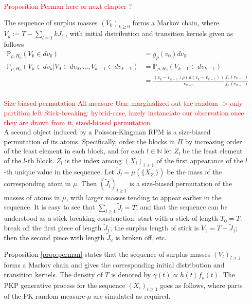 \textcolor{red}{Proposition Perman here or next chapter ?}
\begin{proposition} \label{prop:perman}
The sequence of surplus masses $\left(V_k \right)_{k \ge 0}$ forms a Markov chain, where $V_k := T - \sum_{l=1}k J_l$ , with initial distribution and transition kernels given as follows
\begin{equation*}
\begin{aligned}
\mathbb{P}_{\rho,H_0}(V_0 \in dv_0) &= g_\rho(v_0)dv_0 \\
\mathbb{P}_{\rho,H_0}(V_k \in dv_k|V_0 \in dv_0,\dots, V_{k-1} \in dv_{k-1}) &=  \mathbb{P}_{\rho,H_0}(V_{k-1} \in dv_{k-1})\\
&= \frac{(v_k-v_{k-1})\rho(d(v_k-v_{k-1}))}{v_{k-1}} \frac{f_\rho(v_{k-1})}{f_\rho(v_{k-1})} \\
\end{aligned}
\end{equation*}
\end{proposition}


\textcolor{red}{Size-biased permutation
All measure
Urn: marginalized out the random -> only partition left
Stick-breaking: hybrid-case, lazely instanciate our observation once they are drawn from it, sized-biased permutation }\\

A second object induced by a Poisson-Kingman \gls{RPM} is a size-biased permutation of its atoms. Specifically, order the blocks in $\Pi$ by increasing order of the least element in each block, and for each $l \in \mathbb{N}$ let $Z_l$ be the least element of the $l$-th block. $Z_l$ is the index among $(X_i)_{i \ge 1}$ of the first appearance of the $l$-th unique value in the sequence.
Let $\tilde{J}_l = \mu(\{X_{Z_l}\})$ be the mass of the corresponding atom in $\mu$. Then $(\tilde{J}_l)_{l\ge 1}$ is a size-biased permutation of the masses of atoms in $\mu$, with larger masses tending to appear earlier in the sequence. It is easy to see that $\sum_{l \ge 1}{\tilde{J}_l} = T$, and that the sequence can be understood as a stick-breaking construction: start with a stick of length $T_0 = T$; break off the first piece of length $\tilde{J}_1$; the surplus length of stick is $V_1 = T - \tilde{J}_1$; then
the second piece with length $\tilde{J}_2$ is broken off, etc.

Proposition \ref{prop:perman} \cite{Perman:1992ke} states that the sequence of surplus masses $(V_l)_{l \ge 1}$ forms a Markov chain and gives the corresponding initial distribution and transition kernels. The density of $T$ is denoted by $\gamma(t) \propto h(t) f_\rho(t)$. The PKP generative process for the sequence $(X_i)_{i \ge 1}$ goes as follows, where parts of the \gls{PK} random measure $\mu$ are simulated as required.

